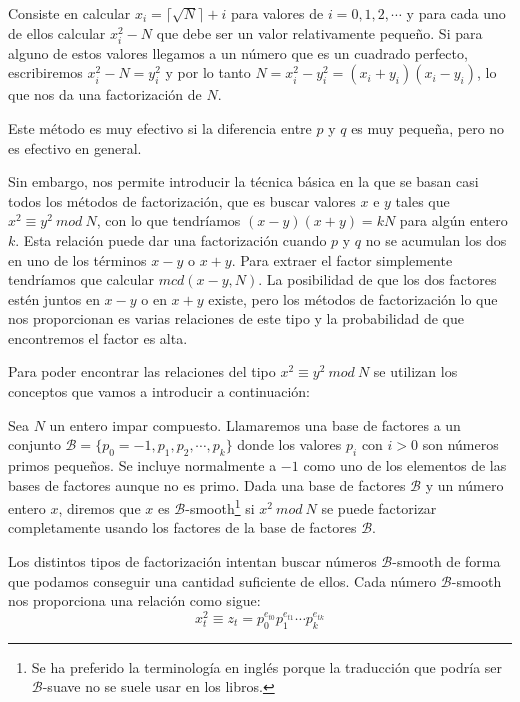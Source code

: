Consiste en calcular $x_i = \lceil\sqrt{N}\rceil + i$ para valores de $i = 0,1,2,\cdots$
y para cada uno de ellos calcular $x_i^2 - N$ que debe ser un valor relativamente peque\~no.
Si para alguno de estos valores llegamos a un n\'umero que es un cuadrado perfecto,
escribiremos $x_i^2 - N = y_i^2$ y por lo tanto $N = x_i^2 - y_i^2 =
(x_i + y_i)(x_i - y_i)$, lo que nos da una factorizaci\'on de $N$.

Este m\'etodo es muy efectivo si la diferencia entre $p$ y $q$ es muy peque\~na, pero no
es efectivo en general.

Sin embargo, nos permite introducir la t\'ecnica b\'asica en la que se basan casi
todos los m\'etodos de factorizaci\'on, que es buscar valores $x$ e $y$ tales que
$x^2 \equiv y^2 ~mod~N$, con lo que tendr\'iamos $(x-y)(x+y) = kN$ para alg\'un entero $k$.
Esta relaci\'on puede dar una factorizaci\'on cuando $p$ y $q$ no se acumulan los dos en
uno de los t\'erminos $x-y$ o $x+y$. Para extraer el factor simplemente tendr\'iamos que
calcular $mcd(x-y,N)$. La posibilidad de que los dos factores est\'en juntos en $x-y$ o
en $x+y$ existe, pero los m\'etodos de factorizaci\'on lo que nos proporcionan es
varias relaciones de este tipo y la probabilidad de que encontremos el factor es alta.

Para poder encontrar las relaciones del tipo $x^2 \equiv y^2 ~mod~N$ se utilizan
los conceptos que vamos a introducir a continuaci\'on:

\begin{definition}
Sea $N$ un entero impar compuesto. Llamaremos una base de factores a un conjunto
${\mathcal B} = \{ p_0 = -1, p_1, p_2, \cdots, p_k \}$ donde los valores $p_i$ con $i>0$ son
n\'umeros primos peque\~nos. Se incluye normalmente a $-1$ como uno de los
elementos de las bases de factores aunque no es primo.
Dada una base de factores ${\mathcal B}$ y un n\'umero entero $x$, diremos
que $x$ es ${\mathcal B}$-smooth\footnote{Se ha preferido la terminolog\'ia en
ingl\'es porque la traducci\'on que podr\'ia ser ${\mathcal B}$-suave no se
suele usar en los libros.} si $x^2~mod~N$ se puede factorizar
completamente usando los factores de la base de factores ${\mathcal B}$.
\end{definition}

Los distintos tipos de factorizaci\'on intentan buscar n\'umeros ${\mathcal B}$-smooth
de forma que podamos conseguir una cantidad suficiente de ellos. Cada n\'umero ${\mathcal B}$-smooth nos
proporciona una relaci\'on como sigue:
\[ x_t^2 \equiv z_t = p_0^{e_{t0}} p_1^{e_{t1}} \cdots p_k^{e_{tk}} \]

